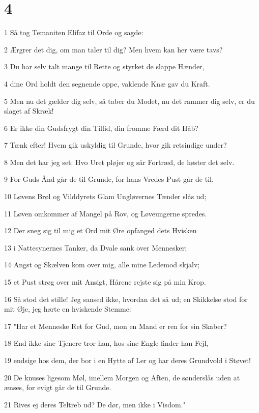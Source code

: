 \chapter{4}

\par 1 Så tog Temaniten Elifaz til Orde og sagde:
\par 2 Ærgrer det dig, om man taler til dig? Men hvem kan her være tavs?
\par 3 Du har selv talt mange til Rette og styrket de slappe Hænder,
\par 4 dine Ord holdt den segnende oppe, vaklende Knæ gav du Kraft.
\par 5 Men nu det gælder dig selv, så taber du Modet, nu det rammer dig selv, er du slaget af Skræk!
\par 6 Er ikke din Gudsfrygt din Tillid, din fromme Færd dit Håb?
\par 7 Tænk efter! Hvem gik uskyldig til Grunde, hvor gik retsindige under?
\par 8 Men det har jeg set: Hvo Uret pløjer og sår Fortræd, de høster det selv.
\par 9 For Guds Ånd går de til Grunde, for hans Vredes Pust går de til.
\par 10 Løvens Brøl og Vilddyrets Glam Ungløvernes Tænder slås ud;
\par 11 Løven omkommer af Mangel på Rov, og Løveungerne spredes.
\par 12 Der sneg sig til mig et Ord mit Øre opfanged dets Hvisken
\par 13 i Nattesynernes Tanker, da Dvale sank over Mennesker;
\par 14 Angst og Skælven kom over mig, alle mine Ledemod skjalv;
\par 15 et Pust strøg over mit Ansigt, Hårene rejste sig på min Krop.
\par 16 Så stod det stille! Jeg sansed ikke, hvordan det så ud; en Skikkelse stod for mit Øje, jeg hørte en hviskende Stemme:
\par 17 "Har et Menneske Ret for Gud, mon en Mand er ren for sin Skaber?
\par 18 End ikke sine Tjenere tror han, hos sine Engle finder han Fejl,
\par 19 endsige hos dem, der bor i en Hytte af Ler og har deres Grundvold i Støvet!
\par 20 De knuses ligesom Møl, imellem Morgen og Aften, de sønderslås uden at ænses, for evigt går de til Grunde.
\par 21 Rives ej deres Teltreb ud? De dør, men ikke i Visdom."

